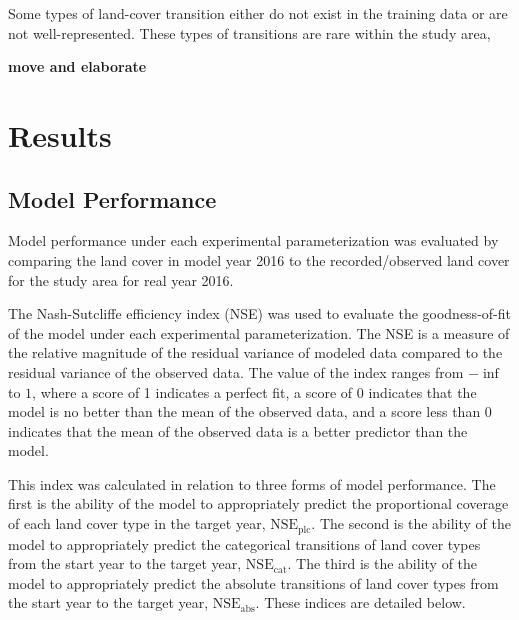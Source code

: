 Some types of land-cover transition either do not exist in the training
data or are not well-represented.
These types of transitions are rare within the study area,

\textbf{move and elaborate}

% 
% 
% 


\section{Results}
\label{sec:land_results}

\subsection{Model Performance}
\label{subsec:land_results_performance}

Model performance under each experimental parameterization was
evaluated by comparing the land cover in model year 2016 to
the recorded/observed land cover for the study area for real year 2016.

The Nash-Sutcliffe efficiency index (NSE) was used to evaluate
the goodness-of-fit of the model under each experimental parameterization.
The NSE is a measure of the relative magnitude of the residual variance
of modeled data compared to the residual variance of the observed data.
The value of the index ranges from $-\inf$ to $1$,
where a score of 1 indicates a perfect fit,
a score of 0 indicates that the model is no better than the mean of the
observed data,
and a score less than 0 indicates that the mean of the observed data
is a better predictor than the model.

This index was calculated in relation to three forms of model performance.
The first is the ability of the model to appropriately predict
the proportional coverage of each land cover type in the target year,
$\text{NSE}_\text{plc}$.
The second is the ability of the model to appropriately predict
the categorical transitions of land cover types from the start year to
the target year,
$\text{NSE}_\text{cat}$.
The third is the ability of the model to appropriately predict
the absolute transitions of land cover types from the start year to
the target year,
$\text{NSE}_\text{abs}$.
These indices are detailed below.

